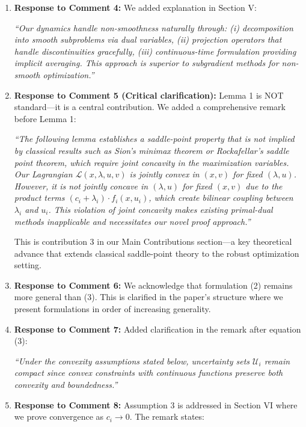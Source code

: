\documentclass[journal,twoside,web]{ieeecolor}
\begin{document}
\begin{enumerate}
\item \textbf{Response to Comment 4:} We added explanation in Section V:

{\color{revisionblue}\textit{``Our dynamics handle non-smoothness naturally through: (i) decomposition into smooth subproblems via dual variables, (ii) projection operators that handle discontinuities gracefully, (iii) continuous-time formulation providing implicit averaging. This approach is superior to subgradient methods for non-smooth optimization.''}}

\item \textbf{Response to Comment 5 (Critical clarification):} Lemma 1 is NOT standard—it is a central contribution. We added a comprehensive remark before Lemma 1:

{\color{revisionblue}\textit{``The following lemma establishes a saddle-point property that is not implied by classical results such as Sion's minimax theorem or Rockafellar's saddle point theorem, which require joint concavity in the maximization variables. Our Lagrangian $\mathcal{L}(x,\lambda,u,v)$ is jointly convex in $(x,v)$ for fixed $(\lambda,u)$. However, it is not jointly concave in $(\lambda,u)$ for fixed $(x,v)$ due to the product terms $(c_i+\lambda_i) \cdot f_i(x,u_i)$, which create bilinear coupling between $\lambda_i$ and $u_i$. This violation of joint concavity makes existing primal-dual methods inapplicable and necessitates our novel proof approach.''}}

This is contribution 3 in our Main Contributions section—a key theoretical advance that extends classical saddle-point theory to the robust optimization setting.

\item \textbf{Response to Comment 6:} We acknowledge that formulation (2) remains more general than (3). This is clarified in the paper's structure where we present formulations in order of increasing generality.

\item \textbf{Response to Comment 7:} Added clarification in the remark after equation (3):

{\color{revisionblue}\textit{``Under the convexity assumptions stated below, uncertainty sets $\mathcal{U}_i$ remain compact since convex constraints with continuous functions preserve both convexity and boundedness.''}}

\item \textbf{Response to Comment 8:} Assumption 3 is addressed in Section VI where we prove convergence as $c_i \to 0$. The remark states:


\end{enumerate}
\end{document}
